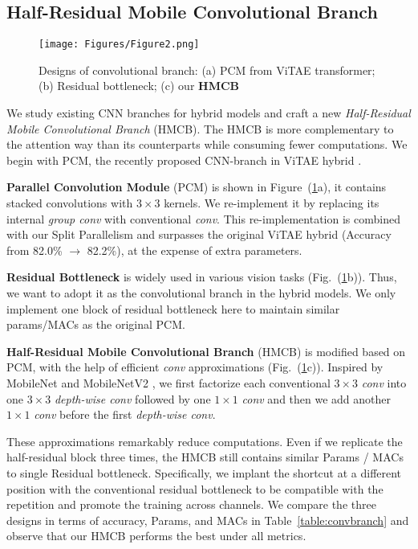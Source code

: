 \documentclass[lettersize,journal]{IEEEtran}
\begin{document}
\subsection{Half-Residual Mobile Convolutional Branch}
\label{sec:conv}
\begin{figure}
\centering
\texttt{[image: Figures/Figure2.png]}
\caption{Designs of convolutional branch: (a) PCM from ViTAE transformer\cite{Xu2021ViTAEVT}; (b) Residual bottleneck; (c) our \textbf{HMCB}}
\label{fig:convbranch}
\end{figure}
We study existing CNN branches for hybrid models and craft a new \textit{Half-Residual Mobile Convolutional Branch} (HMCB). The HMCB is more complementary to the attention way than its counterparts while consuming fewer computations. We begin with PCM, the recently proposed CNN-branch in ViTAE hybrid \cite{Xu2021ViTAEVT}.

\textbf{Parallel Convolution Module} (PCM) is shown in Figure~(\ref{fig:convbranch}a), it contains stacked convolutions with $3\times3$ kernels. We re-implement it by replacing its internal \textit{group conv} with conventional \textit{conv}. 
This re-implementation is combined with our Split Parallelism and surpasses the original ViTAE hybrid (Accuracy from 82.0\% $\rightarrow$ 82.2\%), at the expense of extra parameters.

\textbf{Residual Bottleneck} is widely used in various vision tasks (Fig.~(\ref{fig:convbranch}b)). Thus, we want to adopt it as the convolutional branch in the hybrid models. We only implement one block of residual bottleneck here to maintain similar params/MACs as the original PCM.


\textbf{Half-Residual Mobile Convolutional Branch} (HMCB) is modified based on PCM, with the help of efficient \textit{conv} approximations (Fig.~(\ref{fig:convbranch}c)). Inspired by MobileNet \cite{howard2017mobilenets} and MobileNetV2 \cite{Sandler2018MobileNetV2IR}, 
we first factorize each conventional $3\times3$ \textit{conv} into one $3\times3$ \textit{depth-wise conv} followed by one $1\times1$ \textit{conv} and then we add another $1\times1$ \textit{conv} before the first \textit{depth-wise conv}.


These approximations remarkably reduce computations. Even if we replicate the half-residual block three times, the HMCB still contains similar Params / MACs to single Residual bottleneck. Specifically, we implant the shortcut at a different position with the conventional residual bottleneck to be compatible with the repetition and promote the training across channels. We compare the three designs in terms of accuracy, Params, and MACs in Table~\ref{table:convbranch} and observe that our HMCB performs the best under all metrics.
\end{document}
